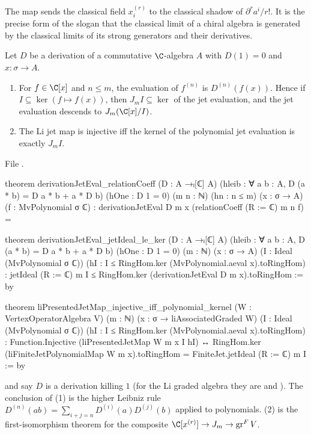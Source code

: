 \begin{physics}
The map sends the classical field $x_i^{(r)}$ to the classical shadow of $\partial^ra^i/r!$. It is the precise form of the slogan that
the classical limit of a chiral algebra is generated by the classical limits of its strong generators and their derivatives.
\end{physics}


\begin{theorem}\label{l11:thm:jetmap}
Let $D$ be a derivation of a commutative $\C$-algebra $A$ with $D(1) = 0$ and $x:\sigma\to A$.
\begin{enumerate}
\item For $f\in\C[x]$ and $n\le m$, the evaluation of $f^{(n)}$ is $D^{(n)}(f(x))$. Hence if $I\subseteq\ker(f\mapsto
  f(x))$, then $J_mI\subseteq\ker$ of the jet evaluation, and the jet evaluation descends to $J_m(\C[x]/I)$.
\item The Li jet map is injective iff the kernel of the polynomial jet evaluation is exactly $J_mI$.
\end{enumerate}
\end{theorem}
\noindent File .
\begin{leancode}
theorem derivationJetEval_relationCoeff (D : A →ₗ[ℂ] A)
    (hleib : ∀ a b : A, D (a * b) = D a * b + a * D b) (hOne : D 1 = 0)
    (m n : ℕ) (hn : n ≤ m)
    (x : σ → A) (f : MvPolynomial σ ℂ) :
    derivationJetEval D m x (relationCoeff (R := ℂ) m n f) =

theorem derivationJetEval_jetIdeal_le_ker (D : A →ₗ[ℂ] A)
    (hleib : ∀ a b : A, D (a * b) = D a * b + a * D b) (hOne : D 1 = 0)
    (m : ℕ) (x : σ → A)
    (I : Ideal (MvPolynomial σ ℂ))
    (hI : I ≤ RingHom.ker (MvPolynomial.aeval x).toRingHom) :
    jetIdeal (R := ℂ) m I ≤ RingHom.ker (derivationJetEval D m x).toRingHom := by

theorem liPresentedJetMap_injective_iff_polynomial_kernel
    (W : VertexOperatorAlgebra V) (m : ℕ)
    (x : σ → liAssociatedGraded W) (I : Ideal (MvPolynomial σ ℂ))
    (hI : I ≤ RingHom.ker (MvPolynomial.aeval x).toRingHom) :
    Function.Injective (liPresentedJetMap W m x I hI) ↔
      RingHom.ker (liFiniteJetPolynomialMap W m x).toRingHom =
        FiniteJet.jetIdeal (R := ℂ) m I := by
\end{leancode}

\begin{dictionary}
 and  say $D$ is a derivation killing $1$ (for the Li graded algebra they are
\allowbreak{} and \allowbreak{}). The conclusion of (1)
is the higher Leibniz rule $D^{(n)}(ab) = \sum_{i+j=n}D^{(i)}(a)D^{(j)}(b)$ applied to polynomials. (2) is the
first-isomorphism theorem for the composite $\C[x^{(r)}]\to J_m\to\lelevengr^FV$.
\end{dictionary}

